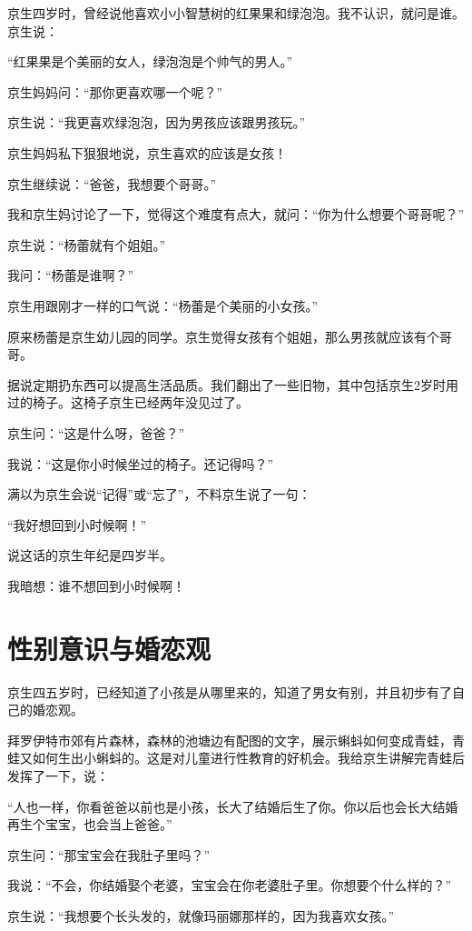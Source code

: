 \documentclass[twoside,openright,headings=optiontohead]{ctexbook} %
\begin{document}
{京生四岁时，曾经说他喜欢小小智慧树的红果果和绿泡泡。我不认识，就问是谁。京生说：

``红果果是个美丽的女人，绿泡泡是个帅气的男人。''

京生妈妈问：``那你更喜欢哪一个呢？''

京生说：``我更喜欢绿泡泡，因为男孩应该跟男孩玩。''

京生妈妈私下狠狠地说，京生喜欢的应该是女孩！

京生继续说：``爸爸，我想要个哥哥。''

我和京生妈讨论了一下，觉得这个难度有点大，就问：``你为什么想要个哥哥呢？''

京生说：``杨蕾就有个姐姐。''

我问：``杨蕾是谁啊？''

京生用跟刚才一样的口气说：``杨蕾是个美丽的小女孩。''

原来杨蕾是京生幼儿园的同学。京生觉得女孩有个姐姐，那么男孩就应该有个哥哥。

据说定期扔东西可以提高生活品质。我们翻出了一些旧物，其中包括京生2岁时用过的椅子。这椅子京生已经两年没见过了。

京生问：``这是什么呀，爸爸？''

我说：``这是你小时候坐过的椅子。还记得吗？''

满以为京生会说``记得''或``忘了''，不料京生说了一句：

``我好想回到小时候啊！''

说这话的京生年纪是四岁半。

我暗想：谁不想回到小时候啊！

\chapter*{性别意识与婚恋观}\label{sex-edu}

京生四五岁时，已经知道了小孩是从哪里来的，知道了男女有别，并且初步有了自己的婚恋观。

拜罗伊特市郊有片森林，森林的池塘边有配图的文字，展示蝌蚪如何变成青蛙，青蛙又如何生出小蝌蚪的。这是对儿童进行性教育的好机会。我给京生讲解完青蛙后发挥了一下，说：

``人也一样，你看爸爸以前也是小孩，长大了结婚后生了你。你以后也会长大结婚再生个宝宝，也会当上爸爸。''

京生问：``那宝宝会在我肚子里吗？''

我说：``不会，你结婚娶个老婆，宝宝会在你老婆肚子里。你想要个什么样的？''

京生说：``我想要个长头发的，就像玛丽娜那样的，因为我喜欢女孩。''

}
\end{document}
